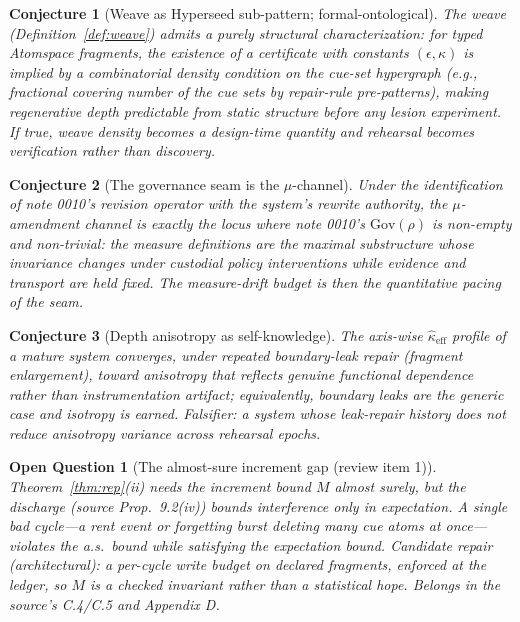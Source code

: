 \documentclass[11pt]{article}
\newtheorem{conjecture}{Conjecture}
\newtheorem{openquestion}{Open Question}
\begin{document}
\begin{conjecture}[Weave as Hyperseed sub-pattern; formal-ontological]
\label{conj:weave}
The weave (Definition~\ref{def:weave}) admits a purely structural characterization: for
typed Atomspace fragments, the existence of a certificate with constants
$(\epsilon, \kappa)$ is implied by a combinatorial density condition on the cue-set
hypergraph (e.g., fractional covering number of the cue sets by repair-rule
pre-patterns), making regenerative depth predictable from static structure before any
lesion experiment. If true, weave density becomes a design-time quantity and rehearsal
becomes verification rather than discovery.
\end{conjecture}

\begin{conjecture}[The governance seam is the $\mu$-channel]\label{conj:seam}
Under the identification of note 0010's revision operator with the system's rewrite
authority, the $\mu$-amendment channel is exactly the locus where note 0010's
$\mathrm{Gov}(\rho)$ is non-empty and non-trivial: the measure definitions are the
maximal substructure whose invariance changes under custodial policy interventions
while evidence and transport are held fixed. The measure-drift budget is then the
quantitative pacing of the seam.
\end{conjecture}

\begin{conjecture}[Depth anisotropy as self-knowledge]
The axis-wise $\hat\kappa_{\mathrm{eff}}$ profile of a mature system converges, under
repeated boundary-leak repair (fragment enlargement), toward anisotropy that reflects
genuine functional dependence rather than instrumentation artifact; equivalently,
boundary leaks are the generic case and isotropy is earned. Falsifier: a system whose
leak-repair history does not reduce anisotropy variance across rehearsal epochs.
\end{conjecture}

\begin{openquestion}[The almost-sure increment gap (review item 1)]
Theorem~\ref{thm:rep}(ii) needs the increment bound $M$ almost surely, but the
discharge (source Prop.~9.2(iv)) bounds interference only \emph{in expectation}. A
single bad cycle---a rent event or forgetting burst deleting many cue atoms at
once---violates the a.s.\ bound while satisfying the expectation bound. Candidate
repair (architectural): a per-cycle write budget on declared fragments, enforced at the
ledger, so $M$ is a checked invariant rather than a statistical hope. Belongs in the
source's C.4/C.5 and Appendix D.
\end{openquestion}
\end{document}
